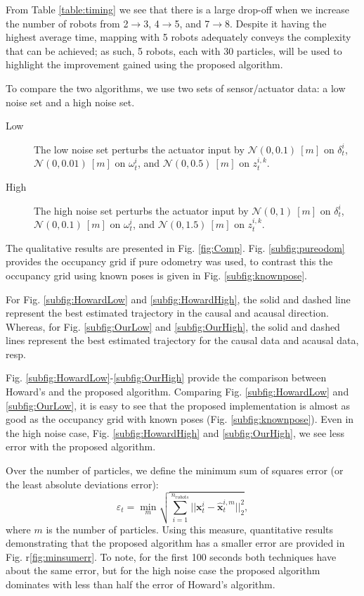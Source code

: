 From Table \ref{table:timing} we see that there is a large drop-off when we increase the number of robots from 2$\rightarrow$3, 4$\rightarrow$5, and 7$\rightarrow$8.  Despite it having the highest average time, mapping with 5 robots adequately conveys the complexity that can be achieved; as such, 5 robots, each with 30 particles, will be used to highlight the improvement gained using the proposed algorithm.  

To compare the two algorithms, we use two sets of sensor/actuator data: a low noise set and a high noise set. 
\begin{description}
\item[Low] The low noise set perturbs the actuator input by $\mathcal{N}(0,0.1)\ [m]$ on $\delta_t^{i}$, $\mathcal{N}(0,0.01)\ [m]$ on $\omega_t^{i}$, and $\mathcal{N}(0,0.5)\ [m]$ on $z_t^{i,k}$.  
\item[High] The high noise set perturbs the actuator input by $\mathcal{N}(0,1)\ [m]$ on $\delta_t^{i}$, $\mathcal{N}(0,0.1)\ [m]$ on $\omega_t^{i}$, and $\mathcal{N}(0,1.5)\ [m]$ on $z_t^{i,k}$.
\end{description}

The qualitative results are presented in Fig. \ref{fig:Comp}.  Fig. \ref{subfig:pureodom} provides the occupancy grid if pure odometry was used, to contrast this the occupancy grid using known poses is given in Fig. \ref{subfig:knownpose}.  

For Fig. \ref{subfig:HowardLow} and \ref{subfig:HowardHigh}, the solid and dashed line represent the best estimated trajectory in the causal and acausal direction.  Whereas, for Fig. \ref{subfig:OurLow} and \ref{subfig:OurHigh}, the solid and dashed lines represent the best estimated trajectory for the causal data and acausal data, resp.

Fig. \ref{subfig:HowardLow}-\ref{subfig:OurHigh} provide the comparison between Howard's and the proposed algorithm.  Comparing Fig. \ref{subfig:HowardLow} and \ref{subfig:OurLow}, it is easy to see that the proposed implementation is almost as good as the occupancy grid with known poses (Fig. \ref{subfig:knownpose}). Even in the high noise case, Fig. \ref{subfig:HowardHigh} and \ref{subfig:OurHigh}, we see less error with the proposed algorithm.  

Over the number of particles, we define the minimum sum of squares error (or the least absolute deviations error):
\begin{equation}
\varepsilon_{t}=\min_{m} \sqrt{\sum_{i=1}^{n_{robots}} ||\textbf{x}_t^i-\hat{\textbf{x}}_t^{i,m}||^2_2},
\end{equation}
where $m$ is the number of particles.  Using this measure, quantitative results demonstrating that the proposed algorithm has a smaller error are provided in Fig. r\ref{fig:minsumerr}.  To note, for the first 100 seconds both techniques have about the same error, but for the high noise case the proposed algorithm dominates with less than half the error of Howard's algorithm.



